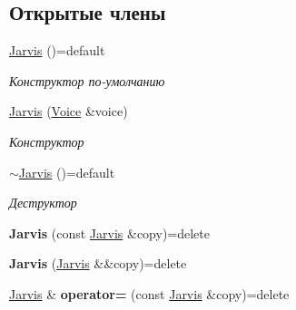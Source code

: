 \subsection*{Открытые члены}
\begin{DoxyCompactItemize}
\item 
\mbox{\label{classJarvis_1_1Jarvis_a34fb8baa346b1019769ea8b00c638dc4}} 
\hyperlink{classJarvis_1_1Jarvis_a34fb8baa346b1019769ea8b00c638dc4}{Jarvis} ()=default
\begin{DoxyCompactList}\small\item\em Конструктор по-\/умолчанию \end{DoxyCompactList}\item 
\hyperlink{classJarvis_1_1Jarvis_ae6a7cc649ef8aabd836c8b549ab39507}{Jarvis} (\hyperlink{classJarvis_1_1Voice}{Voice} \&voice)
\begin{DoxyCompactList}\small\item\em Конструктор \end{DoxyCompactList}\item 
\mbox{\label{classJarvis_1_1Jarvis_aa8670e3e8dfdd5e76cab8f57ccee5461}} 
\hyperlink{classJarvis_1_1Jarvis_aa8670e3e8dfdd5e76cab8f57ccee5461}{$\sim$\+Jarvis} ()=default
\begin{DoxyCompactList}\small\item\em Деструктор \end{DoxyCompactList}\item 
\mbox{\label{classJarvis_1_1Jarvis_ac455d2a57de556bc9a8aa1b80fe99c99}} 
{\bfseries Jarvis} (const \hyperlink{classJarvis_1_1Jarvis}{Jarvis} \&copy)=delete
\item 
\mbox{\label{classJarvis_1_1Jarvis_abf77be09a8b7b116c31f26d17bd0851f}} 
{\bfseries Jarvis} (\hyperlink{classJarvis_1_1Jarvis}{Jarvis} \&\&copy)=delete
\item 
\mbox{\label{classJarvis_1_1Jarvis_a3488a3cc7ce01355c4537ba6dc517b65}} 
\hyperlink{classJarvis_1_1Jarvis}{Jarvis} \& {\bfseries operator=} (const \hyperlink{classJarvis_1_1Jarvis}{Jarvis} \&copy)=delete
\item 
\mbox{\label{classJarvis_1_1Jarvis_aa6a5817a0c85b1a92e61aa5395f96d11}} 

\end{DoxyCompactItemize}
